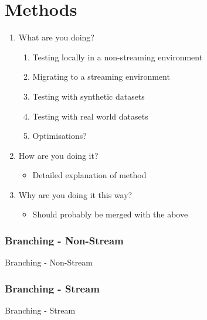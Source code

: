 \section{Methods}

\begin{enumerate}
    \item What are you doing?
          \begin{enumerate}
              \item Testing locally in a non-streaming environment
              \item Migrating to a streaming environment
              \item Testing with synthetic datasets
              \item Testing with real world datasets
              \item Optimisations?
          \end{enumerate}
    \item How are you doing it?
          \begin{itemize}
              \item Detailed explanation of method
          \end{itemize}
    \item Why are you doing it this way?
          \begin{itemize}
              \item Should probably be merged with the above
          \end{itemize}
\end{enumerate}

\subsubsection{Branching - Non-Stream}

\begin{algorithm}[H]
    \caption{Branching - Non-Stream}
    \DontPrintSemicolon
\end{algorithm}

\subsubsection{Branching - Stream}

\begin{algorithm}[H]
    \caption{Branching - Stream}
    \DontPrintSemicolon
\end{algorithm}

